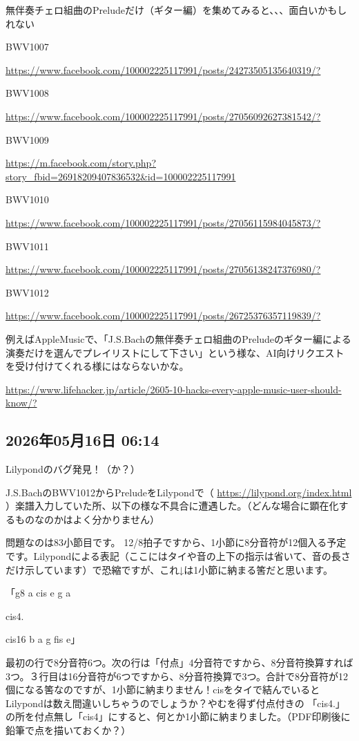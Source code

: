 無伴奏チェロ組曲のPreludeだけ（ギター編）を集めてみると、、、面白いかもしれない

BWV1007

\url{https://www.facebook.com/100002225117991/posts/24273505135640319/?}

BWV1008

\url{https://www.facebook.com/100002225117991/posts/27056092627381542/?}

BWV1009

\url{https://m.facebook.com/story.php?story_fbid=26918209407836532&id=100002225117991}

BWV1010

\url{https://www.facebook.com/100002225117991/posts/27056115984045873/?}

BWV1011

\url{https://www.facebook.com/100002225117991/posts/27056138247376980/?}

BWV1012

\url{https://www.facebook.com/100002225117991/posts/26725376357119839/?}

例えばAppleMusicで、「J.S.Bachの無伴奏チェロ組曲のPreludeのギター編による演奏だけを選んでプレイリストにして下さい」という様な、AI向けリクエストを受け付けてくれる様にはならないかな。

\url{https://www.lifehacker.jp/article/2605-10-hacks-every-apple-music-user-should-know/?}

\subsection*{2026年05月16日 06:14}

Lilypondのバグ発見！（か？）

J.S.BachのBWV1012からPreludeをLilypondで（ \url{https://lilypond.org/index.html} ）楽譜入力していた所、以下の様な不具合に遭遇した。（どんな場合に顕在化するものなのかはよく分かりません）

問題なのは83小節目です。 12/8拍子ですから、1小節に8分音符が12個入る予定です。Lilypondによる表記（ここにはタイや音の上下の指示は省いて、音の長さだけ示しています）で恐縮ですが、これ↓は1小節に納まる筈だと思います。

「g8 a cis e g a

cis4.

cis16 b a g fis e」

最初の行で8分音符6つ。次の行は「付点」4分音符ですから、8分音符換算すれば3つ。３行目は16分音符が6つですから、8分音符換算で3つ。合計で8分音符が12個になる筈なのですが、1小節に納まりません！cisをタイで結んでいるとLilypondは数え間違いしちゃうのでしょうか？やむを得ず付点付きの 「cis4.」の所を付点無し「cis4」にすると、何とか1小節に納まりました。（PDF印刷後に鉛筆で点を描いておくか？）

